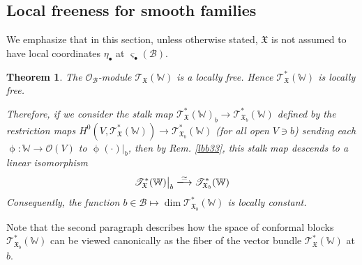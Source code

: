 \documentclass[11pt,b5paper,notitlepage]{article}
\theoremstyle{definition}
\theoremstyle{plain}
\newtheorem{thm}[df]{Theorem}
\newcommand{\mc}{\mathcal}
\newcommand{\scr}{\mathscr}
\newcommand{\sgm}{\varsigma}
\newcommand{\blt}{\bullet}
\newcommand{\Wbb}{\mathbb W}
\newcommand{\<}{\left\langle}
\renewcommand{\>}{\right\rangle}
\newcommand{\MO}{\mathcal{O}}
\newcommand{\MB}{\mathcal{B}}
\newcommand{\fx}{\mathfrak{X}}
\newcommand{\ST}{\mathscr{T}}
\numberwithin{equation}{subsection}
\begin{document}
\subsection{Local freeness for smooth families}\label{lbb69}

We emphasize that in this section, unless otherwise stated, $\fx$ is not assumed to have local coordinates $\eta_\blt$ at $\sgm_\blt(\MB)$.


\begin{thm}\label{lbb35}
The $\MO_\MB$-module $\ST_\fx(\Wbb)$ is a locally free. Hence $\scr T_\fx^*(\Wbb)$ is locally free. 

Therefore, if we consider the stalk map $\scr T_{\fx}^*(\Wbb)_b\rightarrow\scr T_{\fx_b}^*(\Wbb)$ defined by the restriction maps $H^0(V,\scr T_\fx^*(\Wbb))\rightarrow\scr T_{\fx_b}^*(\Wbb)$ (for all open $V\ni b$) sending each $\upphi:\Wbb\rightarrow\mc O(V)$ to $\upphi(\cdot)|_b$, then by Rem. \ref{lbb33}, this stalk map descends to a linear isomorphism
\begin{align*}
\scr T_\fx^*(\Wbb)\big|_b\xlongrightarrow{\simeq}\scr T_{\fx_b}^*(\Wbb)
\end{align*}
Consequently, the function $b\in\MB\mapsto \dim \scr T_{\fx_b}^*(\Wbb)$ is locally constant. 
\end{thm}

Note that the second paragraph describes how the space of conformal blocks $\scr T_{\fx_b}^*(\Wbb)$ can be viewed canonically as the fiber of the vector bundle $\scr T_\fx^*(\Wbb)$ at $b$.
\end{document}
